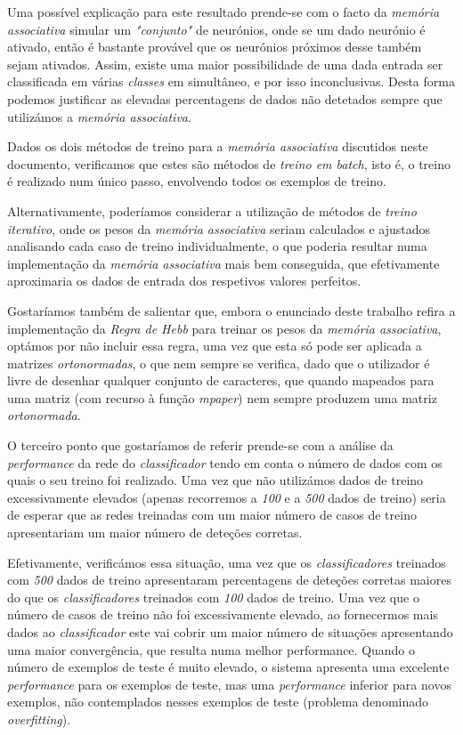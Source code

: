 \documentclass{article}
\begin{document}
Uma possível explicação para este resultado prende-se com o facto da \emph{memória associativa} simular um \emph{"conjunto"} de neurónios, onde se um dado neurónio é ativado, então é bastante provável que os neurónios próximos desse também sejam ativados. Assim, existe uma maior possibilidade de uma dada entrada ser classificada em várias \emph{classes} em simultâneo, e por isso inconclusivas. Desta forma podemos justificar as elevadas percentagens de dados não detetados sempre que utilizámos a \emph{memória associativa}.

Dados os dois métodos de treino para a \emph{memória associativa} discutidos neste documento, verificamos que estes são métodos de \emph{treino em batch}, isto é, o treino é realizado num único passo, envolvendo todos os exemplos de treino.

Alternativamente, poderíamos considerar a utilização de métodos de \emph{treino iterativo}, onde os pesos da \emph{memória associativa} seriam calculados e ajustados analisando cada caso de treino individualmente, o que poderia resultar numa implementação da \emph{memória associativa} mais bem conseguida, que efetivamente aproximaria os dados de entrada dos respetivos valores perfeitos.

Gostaríamos também de salientar que, embora o enunciado deste trabalho refira a implementação da \emph{Regra de Hebb} para treinar os pesos da \emph{memória associativa}, optámos por não incluir essa regra, uma vez que esta só pode ser aplicada a matrizes \emph{ortonormadas}, o que nem sempre se verifica, dado que o utilizador é livre de desenhar qualquer conjunto de caracteres, que quando mapeados para uma matriz (com recurso à função \emph{mpaper}) nem sempre produzem uma matriz \emph{ortonormada}.

O terceiro ponto que gostaríamos de referir prende-se com a análise da \emph{performance} da rede do \emph{classificador} tendo em conta o número de dados com os quais o seu treino foi realizado. Uma vez que não utilizámos dados de treino excessivamente elevados (apenas recorremos a \emph{100} e a \emph{500} dados de treino) seria de esperar que as redes treinadas com um maior número de casos de treino apresentariam um maior número de deteções corretas.

Efetivamente, verificámos essa situação, uma vez que os \emph{classificadores} treinados com \emph{500} dados de treino apresentaram percentagens de deteções corretas maiores do que os \emph{classificadores} treinados com \emph{100} dados de treino. Uma vez que o número de casos de treino não foi excessivamente elevado, ao fornecermos mais dados ao \emph{classificador} este vai cobrir um maior número de situações apresentando uma maior convergência, que resulta numa melhor performance. Quando o número de exemplos de teste é muito elevado, o sistema apresenta uma excelente \emph{performance} para os exemplos de teste, mas uma \emph{performance} inferior para novos exemplos, não contemplados nesses exemplos de teste (problema denominado \emph{overfitting}).
\end{document}
